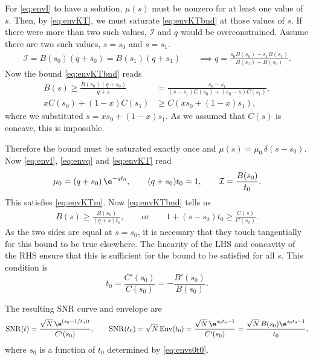 \documentclass[12pt]{article}
\DeclareMathOperator{\snr}{SNR}
\DeclareMathOperator{\env}{Env}
\newcommand{\CI}{\mathcal{I}}
\begin{document}
For \eqref{eq:envI} to have a solution, $\mu(s)$ must be nonzero for at least one value of $s$.
Then, by \eqref{eq:envKT}, we must saturate \eqref{eq:envKTbnd} at those values of $s$.
If there were more than two such values, $\CI$ and $q$ would be overconstrained.
Assume there are two such values, $s=s_0$ and $s=s_1$.
%
\begin{equation}\label{eq:sattwice}
\begin{aligned}
  \CI = B(s_0)(q+s_0) = B(s_1)(q+s_1)
  \qquad
  \implies q = \frac{s_0 B(s_0) - s_1 B(s_1)}{B(s_1)-B(s_0)}.
\end{aligned}
\end{equation}
%
Now the bound \eqref{eq:envKTbnd} reads
%
\begin{equation}\label{eq:satwicebnd}
\begin{aligned}
  B(s) \geq \frac{B(s_0)(q+s_0)}{q+s} &= \frac{s_0-s_1}{(s-s_1)C(s_0)+(s_0-s)C(s_1)}, \\
  xC(s_0)+(1-x)C(s_1) &\geq C(xs_0+(1-x)s_1),
\end{aligned}
\end{equation}
%
where we substituted $s=xs_0+(1-x)s_1$.
As we assumed that $C(s)$ is concave, this is impossible.

Therefore the bound must be saturated exactly once and $\mu(s)=\mu_0\,\delta(s-s_0)$.
Now \eqref{eq:envI}, \eqref{eq:envq} and \eqref{eq:envKT} read
%
\begin{equation}\label{eq:satonce}
  \mu_0 = (q+s_0)\,\e^{-qt_0},
  \qquad
  (q+s_0)t_0 = 1,
  \qquad
  \CI = \frac{B(s_0)}{t_0}.
\end{equation}
%
This satisfies \eqref{eq:envKTm}.
Now \eqref{eq:envKTbnd} tells us
%
\begin{equation}\label{eq:satoncebnd}
\begin{aligned}
  B(s) \geq \frac{B(s_0)}{(q+s)t_0},
  \qquad\text{or}\qquad
  1 + (s-s_0)t_0 \geq \frac{C(s)}{C(s_0)}.
\end{aligned}
\end{equation}
%
As the two sides are equal at $s=s_0$, it is necessary that they touch tangentially for this bound to be true elsewhere.
The linearity of the LHS and concavity of the RHS ensure that this is sufficient for the bound to be satisfied for all $s$.
This condition is
%
\begin{equation}\label{eq:envs0t0}
  t_0 = \frac{C'(s_0)}{C(s_0)} = -\frac{B'(s_0)}{B(s_0)}.
\end{equation}
%

The resulting SNR curve and envelope are
%
\begin{equation}\label{eq:env}
  \snr(t) = \frac{\sqrt{N}\,\e^{(s_0-1/t_0)t}}{C'(s_0)},
  \qquad
  \snr(t_0) = \sqrt{N}\env(t_0) = \frac{\sqrt{N}\,\e^{s_0t_0-1}}{C'(s_0)}
   = \frac{\sqrt{N}\,B(s_0)\e^{s_0t_0-1}}{t_0},
\end{equation}
%
where $s_0$ is a function of $t_0$ determined by \eqref{eq:envs0t0}.
\end{document}
